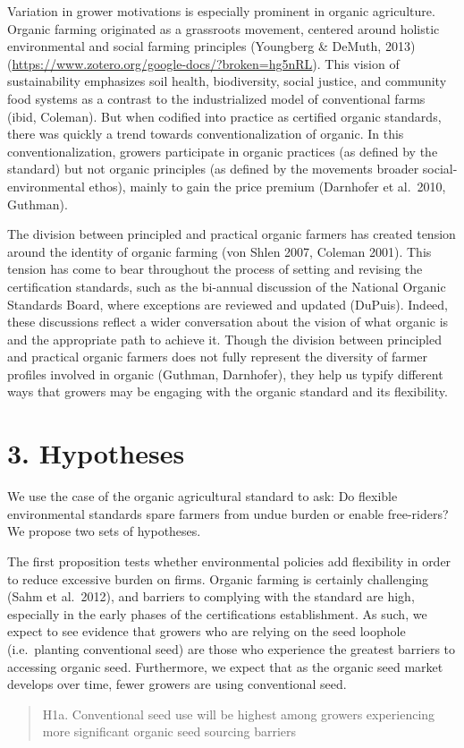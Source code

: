 \documentclass[twoside,12pt,final]{ucthesis-CA2012}
\begin{document}
\begin{ucmainmatter}
Variation in grower motivations is especially prominent in organic
agriculture. Organic farming originated as a grassroots movement,
centered around holistic environmental and social farming principles
(Youngberg \& DeMuth,
2013)(\url{https://www.zotero.org/google-docs/?broken=hg5nRL}). This vision
of sustainability emphasizes soil health, biodiversity, social justice,
and community food systems as a contrast to the industrialized model of
conventional farms (ibid, Coleman). But when codified into practice as
certified organic standards, there was quickly a trend towards
\textquotesingle conventionalization\textquotesingle{} of organic. In this conventionalization, growers
participate in organic practices (as defined by the standard) but not
organic principles (as defined by the movement\textquotesingle s broader
social-environmental ethos), mainly to gain the price premium (Darnhofer
et al.~2010, Guthman).

The division between \textquotesingle principled\textquotesingle{} and \textquotesingle practical\textquotesingle{} organic farmers
has created tension around the identity of organic farming (von Shlen
2007, Coleman 2001). This tension has come to bear throughout the
process of setting and revising the certification standards, such as the
bi-annual discussion of the National Organic Standards Board, where
exceptions are reviewed and updated (DuPuis). Indeed, these discussions
reflect a wider conversation about the vision of what organic is and the
appropriate path to achieve it. Though the division between
\textquotesingle principled\textquotesingle{} and \textquotesingle practical\textquotesingle{} organic farmers does not fully
represent the diversity of farmer profiles involved in organic (Guthman,
Darnhofer), they help us typify different ways that growers may be
engaging with the organic standard and its flexibility.

\hypertarget{hypotheses}{%
\section{3. Hypotheses}\label{hypotheses}}

We use the case of the organic agricultural standard to ask: Do flexible
environmental standards spare farmers from undue burden or enable
free-riders? We propose two sets of hypotheses.

The first proposition tests whether environmental policies add
flexibility in order to reduce excessive burden on firms. Organic
farming is certainly challenging (Sahm et al.~2012), and barriers to
complying with the standard are high, especially in the early phases of
the certification\textquotesingle s establishment. As such, we expect to see evidence
that growers who are relying on the seed loophole (i.e.~planting
conventional seed) are those who experience the greatest barriers to
accessing organic seed. Furthermore, we expect that as the organic seed
market develops over time, fewer growers are using conventional seed.
\begin{quote}
H1a. Conventional seed use will be highest among growers experiencing
more significant organic seed sourcing barriers


\end{quote}
\end{ucmainmatter}
\end{document}
